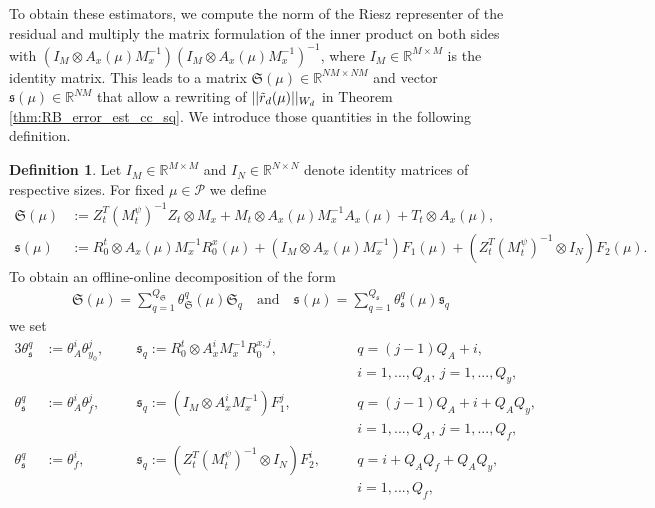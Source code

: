 \documentclass{article}
\theoremstyle{plain}
\theoremstyle{definition}
\newtheorem{definition}[theorem]{Definition}
\theoremstyle{remark}
\newcommand{\RR}{\mathbb{R}}
\begin{document}
To obtain these estimators, we compute the norm of the Riesz representer of the residual and multiply the matrix formulation of the inner product on both sides with $(I_M \otimes A_x(\mu)M_x^{-1})(I_M \otimes A_x(\mu)M_x^{-1})^{-1}$, where $I_M \in \RR^{M\times M}$ is the identity matrix. This leads to a matrix $\mathfrak{S}(\mu) \in \RR^{NM \times NM}$ and vector $\mathfrak{s}(\mu) \in \RR^{NM}$ that allow a rewriting of $\vert \vert \Tilde{r}_d(\mu) \vert \vert _{W_d}$ in Theorem \ref{thm:RB_error_est_cc_sq}. We introduce those quantities in the following definition.
\begin{definition}
Let $I_M \in \RR^{M\times M}$ and $I_N \in \RR^{N\times N}$ denote identity matrices of respective sizes. For fixed $\mu \in \mathcal{P}$ we define
\begin{align}
    \mathfrak{S}(\mu) &:= Z_t^T (M_t^\psi)^{-1} Z_t \otimes M_x + M_t\otimes A_x(\mu) M_x^{-1} A_x(\mu) + T_t\otimes A_x(\mu), \\
    \mathfrak{s}(\mu) &:= R_0^t\otimes A_x(\mu)M_x^{-1} R_0^x(\mu) + \left(I_M \otimes A_x(\mu)M_x^{-1}\right) F_1(\mu) + \left(Z_t^T (M_t^\psi)^{-1} \otimes I_N\right) F_2(\mu).
\end{align}
To obtain an offline-online decomposition of the form
\begin{align}
    \mathfrak{S}(\mu) = \sum_{q=1}^{Q_{\mathfrak{S}}} \theta_{\mathfrak{S}}^{q}(\mu) \mathfrak{S}_{q} \quad \text{and} \quad \mathfrak{s}(\mu) = \sum_{q=1}^{Q_{\mathfrak{s}}} \theta_{\mathfrak{s}}^{q}(\mu) \mathfrak{s}_{q}
\end{align}
we set
\begin{alignat}{3}\label{eq:offlineoperatorstart}
\theta_{\mathfrak{s}}^{q} &:= \theta_{A}^{i} \theta_{y_0}^j, &&\mathfrak{s}_{q} := R_{0}^{t} \otimes A_{x}^{i}M_{x}^{-1}R_{0}^{x,j}, &&q = (j-1) Q_A + i , \\
& && && i = 1, ..., Q_{A}, \, j=1,...,Q_y, \nonumber \\
\theta_{\mathfrak{s}}^{q} &:= \theta_{A}^{i} \theta_{f}^{j}, \quad &&\mathfrak{s}_{q} := \left(I_M \otimes A_{x}^{i} M_{x}^{-1}\right) F_{1}^{j}, \quad &&q = (j-1)Q_{A} + i + Q_{A}Q_y, \\
& && && i = 1, ..., Q_{A}, \, j = 1, ..., Q_{f}, \nonumber \\
\theta_{\mathfrak{s}}^{q} &:= \theta_{f}^{i}, &&\mathfrak{s}_{q} := \left(Z_t^T (M_t^\psi)^{-1} \otimes I_N\right) F_{2}^{i}, \quad &&q = i + Q_{A}Q_{f} + Q_{A}Q_y, \\
& && && i = 1, ..., Q_{f}, \nonumber \\

\end{alignat}
\end{definition}
\end{document}
